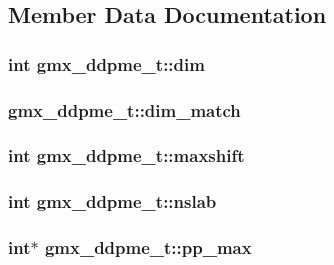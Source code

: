 \subsection{\-Member \-Data \-Documentation}
\hypertarget{structgmx__ddpme__t_a6635621791f9ad76a48db3b587187760}{
\subsubsection[{dim}]{\setlength{\rightskip}{0pt plus 5cm}int {\bf gmx\-\_\-ddpme\-\_\-t\-::dim}}}\label{structgmx__ddpme__t_a6635621791f9ad76a48db3b587187760}
\hypertarget{structgmx__ddpme__t_ab41bfbb7aaaee707647cb37625162be9}{
\subsubsection[{dim\-\_\-match}]{ {\bf gmx\-\_\-ddpme\-\_\-t\-::dim\-\_\-match}}}\label{structgmx__ddpme__t_ab41bfbb7aaaee707647cb37625162be9}
\hypertarget{structgmx__ddpme__t_a5522aca2a39d534d74f31f0e8c06b845}{
\subsubsection[{maxshift}]{\setlength{\rightskip}{0pt plus 5cm}int {\bf gmx\-\_\-ddpme\-\_\-t\-::maxshift}}}\label{structgmx__ddpme__t_a5522aca2a39d534d74f31f0e8c06b845}
\hypertarget{structgmx__ddpme__t_a48a86951d813aa861bd71a67abc21e3c}{
\subsubsection[{nslab}]{\setlength{\rightskip}{0pt plus 5cm}int {\bf gmx\-\_\-ddpme\-\_\-t\-::nslab}}}\label{structgmx__ddpme__t_a48a86951d813aa861bd71a67abc21e3c}
\hypertarget{structgmx__ddpme__t_acfb82d64624c3ab7296ad05c9fb02421}{
\subsubsection[{pp\-\_\-max}]{\setlength{\rightskip}{0pt plus 5cm}int$\ast$ {\bf gmx\-\_\-ddpme\-\_\-t\-::pp\-\_\-max}}}\label{structgmx__ddpme__t_acfb82d64624c3ab7296ad05c9fb02421}
